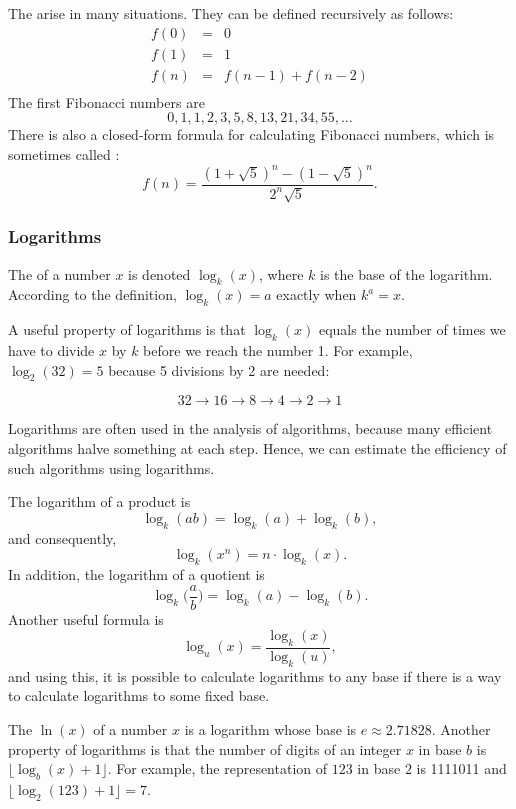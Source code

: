 
The 
arise in many situations.
They can be defined recursively as follows:
\[
\begin{array}{lcl}
f(0) & = & 0 \\
f(1) & = & 1 \\
f(n) & = & f(n-1)+f(n-2) \\
\end{array}
\]
The first Fibonacci numbers are
\[0, 1, 1, 2, 3, 5, 8, 13, 21, 34, 55, \ldots\]
There is also a closed-form formula
for calculating Fibonacci numbers, which is sometimes called
 :
\[f(n)=\frac{(1 + \sqrt{5})^n - (1-\sqrt{5})^n}{2^n \sqrt{5}}.\]

\subsubsection{Logarithms}


The  of a number $x$
is denoted $\log_k(x)$, where $k$ is the base
of the logarithm.
According to the definition,
$\log_k(x)=a$ exactly when $k^a=x$.

A useful property of logarithms is
that $\log_k(x)$ equals the number of times
we have to divide $x$ by $k$ before we reach 
the number 1.
For example, $\log_2(32)=5$
because 5 divisions by 2 are needed:

\[32 \rightarrow 16 \rightarrow 8 \rightarrow 4 \rightarrow 2 \rightarrow 1 \]

Logarithms are often used in the analysis of
algorithms, because many efficient algorithms
halve something at each step.
Hence, we can estimate the efficiency of such algorithms
using logarithms.

The logarithm of a product is
\[\log_k(ab) = \log_k(a)+\log_k(b),\]
and consequently,
\[\log_k(x^n) = n \cdot \log_k(x).\]
In addition, the logarithm of a quotient is
\[\log_k\Big(\frac{a}{b}\Big) = \log_k(a)-\log_k(b).\]
Another useful formula is
\[\log_u(x) = \frac{\log_k(x)}{\log_k(u)},\]
and using this, it is possible to calculate
logarithms to any base if there is a way to
calculate logarithms to some fixed base.


The  $\ln(x)$ of a number $x$
is a logarithm whose base is $e \approx 2.71828$.
Another property of logarithms is that
the number of digits of an integer $x$ in base $b$ is
$\lfloor \log_b(x)+1 \rfloor$.
For example, the representation of
$123$ in base $2$ is 1111011 and
$\lfloor \log_2(123)+1 \rfloor = 7$.

